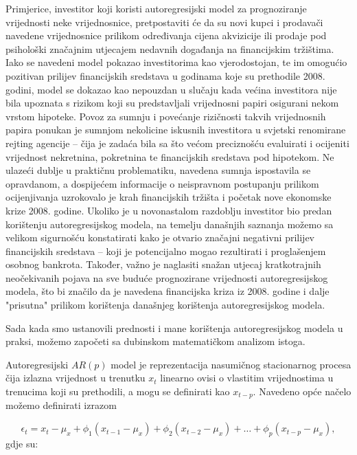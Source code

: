 \documentclass[a4paper,12pt,oneside]{memoir}
\begin{document}
            Primjerice, investitor koji koristi autoregresijski model za prognoziranje vrijednosti neke vrijednosnice, pretpostaviti će da su novi kupci i prodavači navedene vrijednosnice prilikom određivanja cijena akvizicije ili prodaje pod psihološki značajnim utjecajem nedavnih događanja na financijskim tržištima. Iako se navedeni model pokazao investitorima kao vjerodostojan, te im omogućio pozitivan prilijev financijskih sredstava u godinama koje su prethodile 2008. godini, model se dokazao kao nepouzdan u slučaju kada većina investitora nije bila upoznata s rizikom koji su predstavljali vrijednosni papiri osigurani nekom vrstom hipoteke. Povoz za sumnju i povećanje rizičnosti takvih vrijednosnih papira ponukan je sumnjom nekolicine iskusnih investitora u svjetski renomirane rejting agencije -- čija je zadaća bila sa što većom preciznošću evaluirati i ocijeniti vrijednost nekretnina, pokretnina te financijskih sredstava pod hipotekom. Ne ulazeći dublje u praktičnu problematiku, navedena sumnja ispostavila se opravdanom, a dospijećem informacije o neispravnom postupanju prilikom ocijenjivanja uzrokovalo je krah financijskih tržišta i početak nove ekonomske krize 2008. godine. Ukoliko je u novonastalom razdoblju investitor bio predan korištenju autoregresijskog modela, na temelju današnjih saznanja možemo sa velikom sigurnošću konstatirati kako je otvario značajni negativni prilijev financijskih sredstava -- koji je potencijalno mogao rezultirati i proglašenjem osobnog bankrota. Također, važno je naglasiti snažan utjecaj kratkotrajnih neočekivanih pojava na sve buduće prognozirane vrijednosti autoregresijskog modela, što bi značilo da je navedena financijska kriza iz 2008. godine i dalje "prisutna" prilikom korištenja današnjeg korištenja autoregresijskog modela.

            Sada kada smo ustanovili prednosti i mane korištenja autoregresijskog modela u praksi, možemo započeti sa dubinskom matematičkom analizom istoga.

            Autoregresijski $AR(p)$ model je reprezentacija nasumičnog stacionarnog procesa čija izlazna vrijednost u trenutku $x_t$ linearno ovisi o vlastitim vrijednostima u trenucima koji su prethodili, a mogu se definirati kao $x_{t-p}$. Navedeno opće načelo možemo definirati izrazom

            \begin{equation}
                \epsilon_t=x_t-\mu_x+\phi_1(x_{t-1}-\mu_x)+\phi_2(x_{t-2}-\mu_x)+\ldots+\phi_p(x_{t-p}-\mu_x),
                \label{eq:51}
            \end{equation}
            gdje su:
\end{document}

